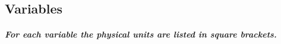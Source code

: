 




\subsection{Variables}

\subparagraph{ For each variable the physical units are listed in square brackets. }

